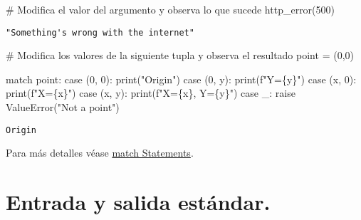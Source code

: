 \documentclass[
  letterpaper,
  DIV=11,
  numbers=noendperiod]{scrreprt}
\newenvironment{Shaded}{\begin{snugshade}}{\end{snugshade}}
\newcommand{\BuiltInTok}[1]{\textcolor[rgb]{0.00,0.23,0.31}{#1}}
\newcommand{\CommentTok}[1]{\textcolor[rgb]{0.37,0.37,0.37}{#1}}
\newcommand{\ControlFlowTok}[1]{\textcolor[rgb]{0.00,0.23,0.31}{#1}}
\newcommand{\DecValTok}[1]{\textcolor[rgb]{0.68,0.00,0.00}{#1}}
\newcommand{\NormalTok}[1]{\textcolor[rgb]{0.00,0.23,0.31}{#1}}
\newcommand{\OperatorTok}[1]{\textcolor[rgb]{0.37,0.37,0.37}{#1}}
\newcommand{\PreprocessorTok}[1]{\textcolor[rgb]{0.68,0.00,0.00}{#1}}
\newcommand{\SpecialCharTok}[1]{\textcolor[rgb]{0.37,0.37,0.37}{#1}}
\newcommand{\SpecialStringTok}[1]{\textcolor[rgb]{0.13,0.47,0.30}{#1}}
\newcommand{\StringTok}[1]{\textcolor[rgb]{0.13,0.47,0.30}{#1}}
\begin{document}
\begin{Shaded}
\begin{Highlighting}[]
\CommentTok{\# Modifica el valor del argumento y observa lo que sucede}
\NormalTok{http\_error(}\DecValTok{500}\NormalTok{)}
\end{Highlighting}
\end{Shaded}

\begin{verbatim}
"Something's wrong with the internet"
\end{verbatim}

\begin{Shaded}
\begin{Highlighting}[]
\CommentTok{\# Modifica los valores de la siguiente tupla y observa el resultado}
\NormalTok{point }\OperatorTok{=}\NormalTok{ (}\DecValTok{0}\NormalTok{,}\DecValTok{0}\NormalTok{)}

\ControlFlowTok{match}\NormalTok{ point:}
\NormalTok{    case (}\DecValTok{0}\NormalTok{, }\DecValTok{0}\NormalTok{):}
        \BuiltInTok{print}\NormalTok{(}\StringTok{"Origin"}\NormalTok{)}
\NormalTok{    case (}\DecValTok{0}\NormalTok{, y):}
        \BuiltInTok{print}\NormalTok{(}\SpecialStringTok{f"Y=}\SpecialCharTok{\{}\NormalTok{y}\SpecialCharTok{\}}\SpecialStringTok{"}\NormalTok{)}
\NormalTok{    case (x, }\DecValTok{0}\NormalTok{):}
        \BuiltInTok{print}\NormalTok{(}\SpecialStringTok{f"X=}\SpecialCharTok{\{}\NormalTok{x}\SpecialCharTok{\}}\SpecialStringTok{"}\NormalTok{)}
\NormalTok{    case (x, y):}
        \BuiltInTok{print}\NormalTok{(}\SpecialStringTok{f"X=}\SpecialCharTok{\{}\NormalTok{x}\SpecialCharTok{\}}\SpecialStringTok{, Y=}\SpecialCharTok{\{}\NormalTok{y}\SpecialCharTok{\}}\SpecialStringTok{"}\NormalTok{)}
    \ControlFlowTok{case}\NormalTok{ \_:}
        \ControlFlowTok{raise} \PreprocessorTok{ValueError}\NormalTok{(}\StringTok{"Not a point"}\NormalTok{)}
\end{Highlighting}
\end{Shaded}

\begin{verbatim}
Origin
\end{verbatim}

Para más detalles véase
\href{https://docs.python.org/3/tutorial/controlflow.html\#match-statements}{match
Statements}.


\chapter{Entrada y salida
estándar.}\label{entrada-y-salida-estuxe1ndar.}
\end{document}
